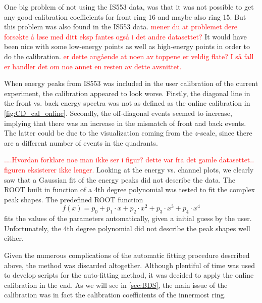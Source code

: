 \documentclass[twoside,english]{uiofysmaster/uiofysmaster}
\let\orgautoref\autoref
\renewcommand{\autoref}
        {%
		 \def\sectionautorefname{Section}%
		 \def\subsectionautorefname{Section}%
		 \def\subsubsectionautorefname{Section}%
		 \def\chapterautorefname{Chapter}%
          \orgautoref}
\begin{document}
One big problem of not using the IS553 data, was that it was not possible to get any good calibration coefficients for front ring 16 and maybe also ring 15.
But this problem was also found in the IS553 data. 
\textcolor{red}{mener du at problemet dere forsøkte å løse med ditt eksp fantes også i det andre datasettet?}
It would have been nice with some low-energy points as well as high-energy points in order to do the calibration. 
\textcolor{red}{er dette angående at noen av toppene er veldig flate? I så fall er handler det om noe annet en resten av dette avsnittet.}

When energy peaks from IS553 was included in the user calibration of the current experiment, the calibration appeared to look worse. 
Firstly, the diagonal line in the front vs. back energy spectra was not as defined as the online calibration in \autoref{fig:CD_cal_online}.
Secondly, the off-diagonal events seemed to increase, implying that there was an increase in the mismatch of front and back events. 
The latter could be due to the visualization coming from the $z$-scale, since there are a different number of events in the quadrants. 

\textcolor{red}{....Hvordan forklare noe man ikke ser i figur? dette var fra det gamle datasettet.. figuren eksisterer ikke lenger.}
Looking at the energy vs. channel plots, we clearly saw that a Gaussian fit of the energy peaks did not describe the data.
The ROOT built in function of a 4th degree polynomial was tested to fit the complex peak shapes. 
The predefined ROOT function 
\begin{equation}
	f(x) = p_0 + p_1 \cdot x + p_2 \cdot x^2 + p_3 \cdot x^3 + p_4 \cdot x^4
\end{equation}
fits the values of the parameters automatically, given a initial guess by the user. 
Unfortunately, the 4th degree polynomial did not describe the peak shapes well either.

Given the numerous complications of the automatic fitting procedure described above, the method was discarded altogether. 
Although plentiful of time was used to develop scripts for the auto-fitting method, it was decided to apply the online calibration in the end.
As we will see in \autoref{sec:BDS}, the main issue of the calibration was in fact the calibration coefficients of the innermost ring.
\end{document}
